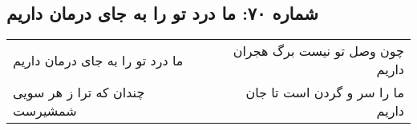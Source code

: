 \begin{center}
\section*{شماره ۷۰: ما درد تو را به جای درمان داریم}
\label{sec:070}
\begin{longtable}{l p{0.5cm} r}
ما درد تو را به جای درمان داریم
&&
چون وصل تو نیست برگ هجران داریم
\\
چندان که ترا ز هر سویی شمشیرست
&&
ما را سر و گردن است تا جان داریم
\\
\end{longtable}
\end{center}
